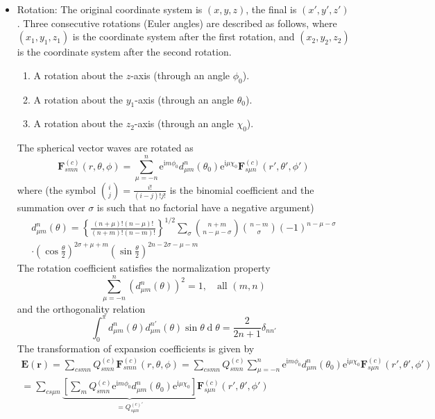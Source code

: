 \documentclass[a4paper,12pt]{article}
\renewcommand{\vec}[1]{\boldsymbol{#1}}
\newcommand{\mrm}[1]{\mathrm{#1}}
\newcommand{\diff}{\operatorname{d}\!}
\newcommand{\iu}{\mrm{i}}
\newcommand{\eu}{\mrm{e}}
\newcommand{\Ev}{\vec{E}}
\newcommand{\Fv}{\vec{F}}
\newcommand{\rv}{\vec{r}}
\begin{document}
\begin{itemize}
\item Rotation: The original coordinate system is $(x,y,z)$, the final
  is $(x',y',z')$. Three consecutive rotations (Euler angles) are
  described as follows, where $(x_{1},y_{1},z_{1})$ is the coordinate
  system after the first rotation, and $(x_{2},y_{2},z_{2})$ is the
  coordinate system after the second rotation.
  \begin{enumerate}
  \item A rotation about the $z$-axis (through an angle $\phi_{0}$).
  \item A rotation about the $y_{1}$-axis (through an angle $\theta_{0}$).
  \item A rotation about the $z_{2}$-axis (through an angle $\chi_{0}$). 
  \end{enumerate}
  The spherical vector waves are rotated as
  \begin{equation}
    \Fv_{smn}^{(c)}(r,\theta,\phi) = \sum_{\mu=-n}^{n} \eu^{\iu m\phi_{0}} d_{\mu m}^{n}(\theta_{0})\eu^{\iu\mu\chi_{0}} \Fv_{s\mu n}^{(c)}(r',\theta',\phi')
  \end{equation}
  where (the symbol $\binom{i}{j} = \frac{i!}{(i-j)!j!}$ is the
  binomial coefficient and the summation over $\sigma$ is such that no
  factorial have a negative argument)
  \begin{multline}
    d_{\mu m}^{n}(\theta) = \left\{\frac{(n+\mu)!(n-\mu)!}{(n+m)!(n-m)!}\right\}^{1/2} \sum_{\sigma} \binom{n+m}{n-\mu-\sigma}\binom{n-m}{\sigma} (-1)^{n-\mu-\sigma} \\
    \cdot\left(\cos\frac{\theta}{2}\right)^{2\sigma+\mu+m} \left(\sin\frac{\theta}{2}\right)^{2n-2\sigma-\mu-m}
  \end{multline}
  The rotation coefficient satisfies the normalization property
  \begin{equation}
    \sum_{\mu=-n}^{n}(d_{\mu m}^{n}(\theta))^{2} = 1, \quad \text{all $(m,n)$}
  \end{equation}
  and the orthogonality relation
  \begin{equation}
    \int_{0}^{\pi} d_{\mu m}^{n}(\theta)d_{\mu m}^{n'}(\theta)\sin\theta\diff\theta = \frac{2}{2n+1}\delta_{nn'}
  \end{equation}
  The transformation of expansion coefficients is given by
  \begin{multline}
    \Ev(\rv) = \sum_{csmn} Q_{smn}^{(c)}\Fv_{smn}^{(c)}(r,\theta,\phi) = \sum_{csmn} Q_{smn}^{(c)}\sum_{\mu=-n}^{n}\eu^{\iu m\phi_{0}} d_{\mu m}^{n}(\theta_{0})\eu^{\iu\mu\chi_{0}} \Fv_{s\mu n}^{(c)}(r',\theta',\phi') \\
    = \sum_{cs\mu n}\underbrace{\left[\sum_{m} Q_{smn}^{(c)}\eu^{\iu m\phi_{0}} d_{\mu m}^{n}(\theta_{0})\eu^{\iu\mu\chi_{0}}\right]}_{=Q_{s\mu n}^{(c)'}} \Fv_{s\mu n}^{(c)}(r',\theta',\phi') 
  \end{multline}
  

\end{itemize}
\end{document}
